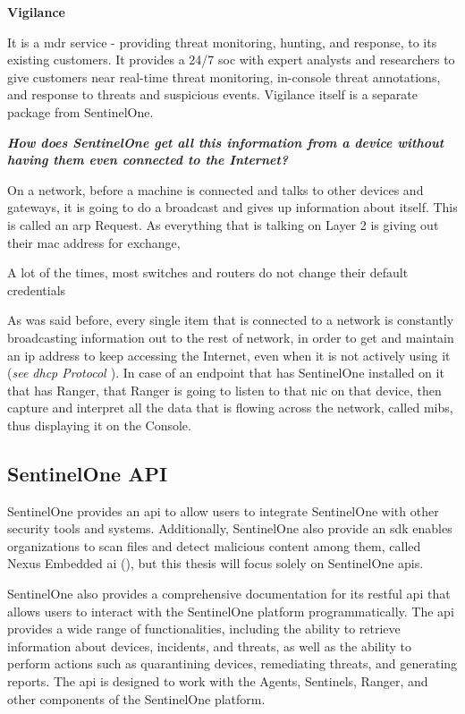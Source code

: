 \begin{multicols}{2}
      \textbf{Vigilance}

      It is a \acrshort{mdr} service - providing threat monitoring, hunting, and response, to its existing customers. It
      provides a 24/7 \acrshort{soc} with expert analysts and researchers to give customers near real-time threat monitoring,
      in-console threat annotations, and response to threats and suspicious events. Vigilance itself is a separate package from
      SentinelOne.

      \textbf{\textit{How does SentinelOne get all this information from a device without having them even connected to the Internet?}}

      On a network, before a machine is connected and talks to other devices
      and gateways, it is going to do a broadcast and gives up information about itself. This is called an \acrshort{arp} Request.
      As everything that is talking on Layer 2 is giving out their \acrshort{mac} address for exchange,

      A lot of the times, most switches and routers do not change their default credentials

      As was said before, every single item that is connected to a network is constantly broadcasting information out to the rest of
      network, in order to get and maintain an \acrshort{ip} address to keep accessing the Internet, even when it is not actively using
      it (\textit{see \acrshort{dhcp} Protocol \cite{dhcpProcess}}). In case of an endpoint that has SentinelOne installed on it that
      has Ranger, that Ranger is going to listen to that \acrshort{nic} on that device, then capture and interpret all the data that
      is flowing across the network, called \acrshort{mib}s, thus displaying it on the Console.

      \subsection{SentinelOne API}
      SentinelOne provides an \acrshort{api} to allow users to integrate SentinelOne with other security tools and systems. Additionally,
      SentinelOne also provide an \acrshort{sdk} enables organizations to scan files and detect malicious content among them, called
      Nexus Embedded \acrshort{ai} (\textit{\cite{nexusSDK}}), but this thesis will focus solely on SentinelOne \acrshort{api}s.

      SentinelOne also provides a comprehensive documentation for its \acrshort{rest}ful \acrshort{api} that allows users to interact
      with the SentinelOne platform programmatically. The \acrshort{api} provides a wide range of functionalities, including the ability
      to retrieve information about devices, incidents, and threats, as well as the ability to perform actions such as quarantining devices,
      remediating threats, and generating reports. The \acrshort{api} is designed to work with the Agents, Sentinels, Ranger, and other
      components of the SentinelOne platform.


\end{multicols}
